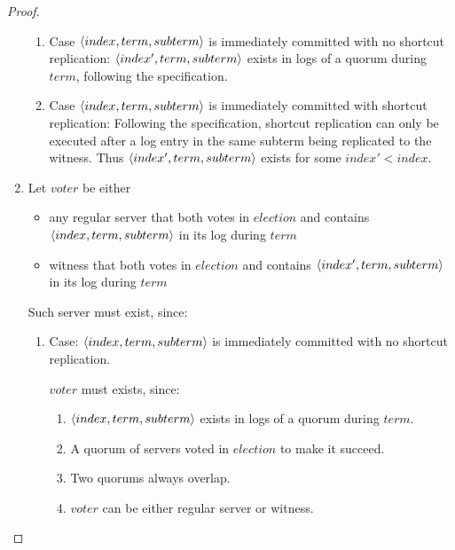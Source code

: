 \begin{proof}
\begin{enumerate}
			  \begin{enumerate}
				\item Case $\langle index,term,subterm \rangle$ is immediately committed with no shortcut replication: $\langle index',term,subterm \rangle$ exists in logs of a quorum during $term$, following the specification.
				\item Case $\langle index,term,subterm \rangle$ is immediately committed with shortcut replication: Following the specification, shortcut replication can only be executed after a log entry in the same subterm being replicated to the witness. Thus $\langle index',term,subterm \rangle$ exists for some $index'<index$.
			  \end{enumerate}
		\item Let $voter$ be either
		\begin{itemize}
			\item any regular server that both votes in $election$ and contains $\langle index, term, subterm \rangle$ in its log during $term$
			\item witness that both votes in $election$ and contains $\langle index',term,subterm \rangle$ in its log during $term$
		\end{itemize}
		 Such server must exist, since:
			\begin{enumerate}
				\item Case: $\langle index, term, subterm \rangle$ is immediately committed with no shortcut replication.
				
				$voter$ must exists, since:
				\begin{enumerate}
					\item $\langle index,term,subterm \rangle$ exists in logs of a quorum during $term$.
					\item A quorum of servers voted in $election$ to make it succeed.
					\item Two quorums always overlap.
					\item $voter$ can be either regular server or witness.
				\end{enumerate}


\end{enumerate}
\end{enumerate}
\end{proof}
